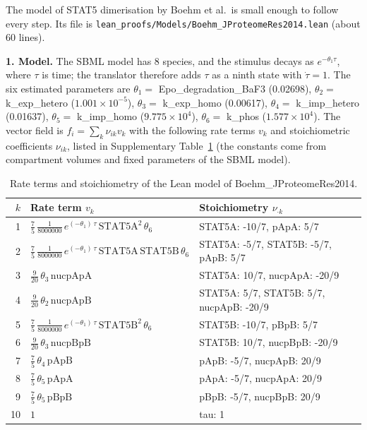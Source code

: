 The model of STAT5 dimerisation by Boehm et al.\ is small enough to follow every step. Its file is \texttt{lean\_proofs/Models/Boehm\_JProteomeRes2014.lean} (about 60 lines).

\textbf{1. Model.} The SBML model has 8 species, and the stimulus decays as $e^{-\theta_1\tau}$, where $\tau$ is time; the translator therefore adds $\tau$ as a ninth state with $\dot\tau=1$. The six estimated parameters are $\theta_{1}=$ Epo\_degradation\_BaF3 (0.02698), $\theta_{2}=$ k\_exp\_hetero ($1.001\times10^{-5}$), $\theta_{3}=$ k\_exp\_homo (0.00617), $\theta_{4}=$ k\_imp\_hetero (0.01637), $\theta_{5}=$ k\_imp\_homo ($9.775\times10^{4}$), $\theta_{6}=$ k\_phos ($1.577\times10^{4}$). The vector field is $f_i=\sum_k\nu_{ik}v_k$ with the following rate terms $v_k$ and stoichiometric coefficients $\nu_{ik}$, listed in Supplementary Table~\ref{tab:boehm} (the constants come from compartment volumes and fixed parameters of the SBML model).

{\small
\begin{longtable}{@{}r>{\raggedright\arraybackslash}p{9.6cm}>{\raggedright\arraybackslash}p{5.2cm}@{}}
\caption{Rate terms and stoichiometry of the Lean model of Boehm\_JProteomeRes2014.}\label{tab:boehm}\\
\toprule
$k$ & Rate term $v_k$ & Stoichiometry $\nu_{\cdot k}$ \\
\midrule
1 & $\tfrac{7}{5}\,\tfrac{1}{8000000}\,e^{\left(-\theta_{1}\right)\,\tau}\,\mathrm{STAT5A}^{2}\,\theta_{6}$ & STAT5A: -10/7, pApA: 5/7 \\
2 & $\tfrac{7}{5}\,\tfrac{1}{8000000}\,e^{\left(-\theta_{1}\right)\,\tau}\,\mathrm{STAT5A}\,\mathrm{STAT5B}\,\theta_{6}$ & STAT5A: -5/7, STAT5B: -5/7, pApB: 5/7 \\
3 & $\tfrac{9}{20}\,\theta_{3}\,\mathrm{nucpApA}$ & STAT5A: 10/7, nucpApA: -20/9 \\
4 & $\tfrac{9}{20}\,\theta_{2}\,\mathrm{nucpApB}$ & STAT5A: 5/7, STAT5B: 5/7, nucpApB: -20/9 \\
5 & $\tfrac{7}{5}\,\tfrac{1}{8000000}\,e^{\left(-\theta_{1}\right)\,\tau}\,\mathrm{STAT5B}^{2}\,\theta_{6}$ & STAT5B: -10/7, pBpB: 5/7 \\
6 & $\tfrac{9}{20}\,\theta_{3}\,\mathrm{nucpBpB}$ & STAT5B: 10/7, nucpBpB: -20/9 \\
7 & $\tfrac{7}{5}\,\theta_{4}\,\mathrm{pApB}$ & pApB: -5/7, nucpApB: 20/9 \\
8 & $\tfrac{7}{5}\,\theta_{5}\,\mathrm{pApA}$ & pApA: -5/7, nucpApA: 20/9 \\
9 & $\tfrac{7}{5}\,\theta_{5}\,\mathrm{pBpB}$ & pBpB: -5/7, nucpBpB: 20/9 \\
10 & $1$ & tau: 1 \\
\bottomrule
\end{longtable}
}

